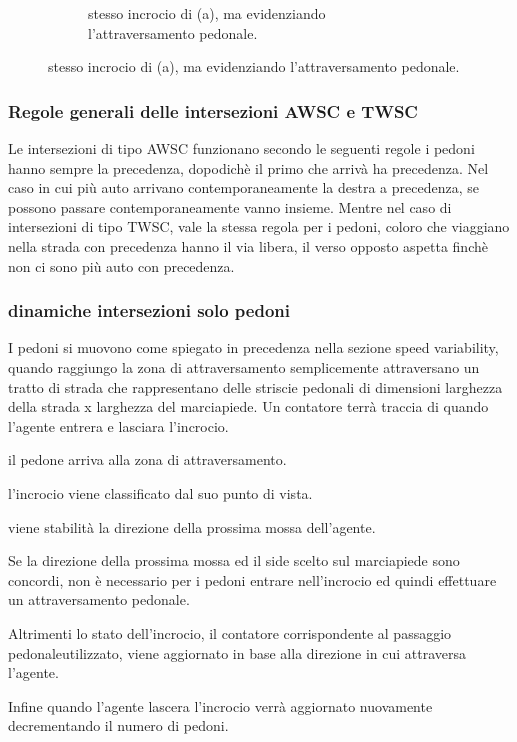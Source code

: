 \begin{figure}
\begin{subfigure}[b]{0.9\textwidth}
    \label{fig:intersection state}
    \caption{stesso incrocio di (a), ma evidenziando l'attraversamento pedonale.}
  \end{subfigure}
\end{figure}

\subsubsection{Regole generali delle intersezioni AWSC e TWSC} 
Le intersezioni di tipo AWSC funzionano secondo le seguenti regole i pedoni hanno sempre la precedenza, dopodichè il primo che arrivà ha precedenza.
Nel caso in cui più auto arrivano contemporaneamente la destra a precedenza, se possono passare contemporaneamente vanno insieme.
Mentre nel caso di intersezioni di tipo TWSC, vale la stessa regola per i pedoni, coloro che viaggiano nella strada con precedenza hanno il via libera,
il verso opposto aspetta finchè non ci sono più auto con precedenza.

\newpage


\subsubsection{dinamiche intersezioni solo pedoni}
I pedoni si muovono come spiegato in precedenza nella sezione speed variability,
quando raggiungo la zona di attraversamento semplicemente
attraversano un tratto di strada che rappresentano delle striscie pedonali di dimensioni
larghezza della strada x larghezza del marciapiede.
Un contatore terrà traccia di quando l'agente entrera e lasciara l'incrocio.


il pedone arriva alla zona di attraversamento.

l'incrocio viene classificato dal suo punto di vista.

viene stabilità la direzione della prossima mossa dell'agente.

Se la direzione della prossima mossa ed il side scelto sul marciapiede sono concordi,
non è necessario per i pedoni entrare nell'incrocio ed quindi effettuare un attraversamento pedonale.

Altrimenti lo stato dell'incrocio, il contatore corrispondente al passaggio pedonaleutilizzato,
viene aggiornato in base alla direzione in cui attraversa l'agente.

Infine quando l'agente lascera l'incrocio verrà aggiornato nuovamente decrementando il numero di pedoni.



